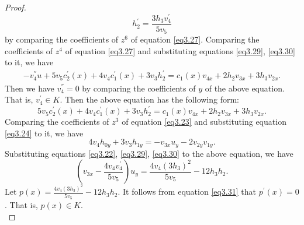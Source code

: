 \documentclass[12pt, twoside, leqno]{article}
\theoremstyle{definition}
\numberwithin{equation}{section}
\begin{document}
\begin{proof}
\begin{equation}\label{eq3.31}
h_{2}^{'}=\frac{3h_{3}v_{4}^{'}}{5v_{5}}
\end{equation}
by comparing the coefficients of $z^6$ of equation \eqref{eq3.27}. Comparing the coefficients of $z^4$ of equation \eqref{eq3.27} and substituting equations \eqref{eq3.29}, \eqref{eq3.30} to it, we have
\begin{equation}\nonumber
\begin{split}
-v_{4}^{''}u+5v_{5}c_{2}^{'}(x)+4v_{4}c_{1}^{'}(x)+3v_{3}h_{2}^{'}=c_{1}(x)v_{4x}+2h_{2}v_{3x}+3h_{3}v_{2x}.
\end{split}
\end{equation}
Then we have $v_{4}^{''}=0$ by comparing the coefficients of $y$ of the above equation. That is, $v_4^{'}\in K$. Then the above equation has the following form:
\begin{equation}\label{eq3.32}
5v_{5}c_{2}^{'}(x)+4v_{4}c_{1}^{'}(x)+3v_{3}h_{2}^{'}=c_{1}(x)v_{4x}+2h_{2}v_{3x}+3h_{3}v_{2x}.
\end{equation}
Comparing the coefficients of $z^3$ of equation \eqref{eq3.23} and substituting equation \eqref{eq3.24} to it, we have
$$4v_{4}h_{0y}+3v_{3}h_{1y}=-v_{3x}u_{y}-2v_{2y}v_{1y}.$$
Substituting equations \eqref{eq3.22}, \eqref{eq3.29}, \eqref{eq3.30} to the above equation, we have
\begin{equation}\label{eq3.33}
\left(v_{3x}-\frac{4v_{4}v_{4}^{'}}{5v_{5}} \right) u_{y}=\frac{4v_{4}(3h_{3})^{2}}{5v_{5}}-12h_{3}h_{2}.
\end{equation}
Let $p(x)=\frac{4v_{4}(3h_{3})^{2}}{5v_{5}}-12h_{3}h_{2}$. It follows from equation \eqref{eq3.31} that $ p^{'}(x)=0$. That is, $p(x)\in K$.\\


\end{proof}
\end{document}
